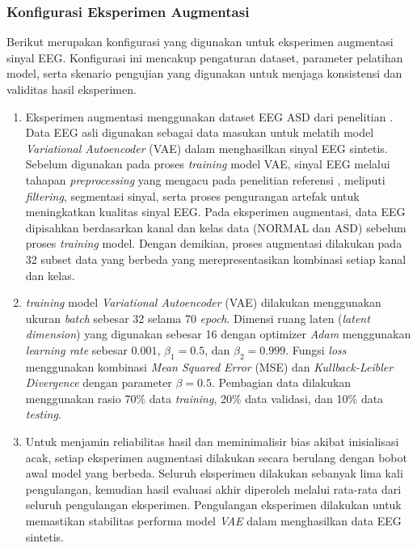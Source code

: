 \subsubsection{Konfigurasi Eksperimen Augmentasi}
Berikut merupakan konfigurasi yang digunakan untuk eksperimen augmentasi sinyal EEG. Konfigurasi ini mencakup pengaturan dataset, parameter pelatihan model, serta skenario pengujian yang digunakan untuk menjaga konsistensi dan validitas hasil eksperimen.
\begin{enumerate}
\item {}
    Eksperimen augmentasi menggunakan dataset EEG ASD dari penelitian \cite{eeg_dataset_asd}. Data EEG asli digunakan sebagai data masukan untuk melatih model \textit{Variational Autoencoder} (VAE) dalam menghasilkan sinyal EEG sintetis. Sebelum digunakan pada proses \textit{training} model VAE, sinyal EEG melalui tahapan \textit{preprocessing} yang mengacu pada penelitian referensi \cite{paper_ref}, meliputi \textit{filtering}, segmentasi sinyal, serta proses pengurangan artefak untuk meningkatkan kualitas sinyal EEG. Pada eksperimen augmentasi, data EEG dipisahkan berdasarkan kanal dan kelas data (NORMAL dan ASD) sebelum proses \textit{training} model. Dengan demikian, proses augmentasi dilakukan pada 32 subset data yang berbeda yang merepresentasikan kombinasi setiap kanal dan kelas.

    \item {}
    \textit{training} model \textit{Variational Autoencoder} (VAE) dilakukan menggunakan ukuran \textit{batch} sebesar 32 selama 70 \textit{epoch}. Dimensi ruang laten (\textit{latent dimension}) yang digunakan sebesar 16 dengan optimizer \textit{Adam} menggunakan \textit{learning rate} sebesar $0.001$, $\beta_1 = 0.5$, dan $\beta_2 = 0.999$. Fungsi \textit{loss} menggunakan kombinasi \textit{Mean Squared Error} (MSE) dan \textit{Kullback-Leibler Divergence} dengan parameter $\beta = 0.5$. Pembagian data dilakukan menggunakan rasio 70\% data \textit{training}, 20\% data validasi, dan 10\% data \textit{testing}.

    \item {}
    Untuk menjamin reliabilitas hasil dan meminimalisir bias akibat inisialisasi acak, setiap eksperimen augmentasi dilakukan secara berulang dengan bobot awal model yang berbeda. Seluruh eksperimen dilakukan sebanyak lima kali pengulangan, kemudian hasil evaluasi akhir diperoleh melalui rata-rata dari seluruh pengulangan eksperimen. Pengulangan eksperimen dilakukan untuk memastikan stabilitas performa model \textit{VAE} dalam menghasilkan data EEG sintetis.
\end{enumerate}

